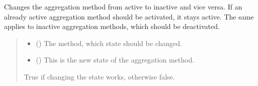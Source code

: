 \documentclass[letterpaper,10pt,english]{sphinxmanual}
\begin{document}
\begin{fulllineitems}
\begin{fulllineitems}
\label{\detokenize{apidoc/src.osm_configurator.model.project.configuration:src.osm_configurator.model.project.configuration.aggregation_configuration.AggregationConfiguration.set_aggregation_method_active}}
\pysigstartsignatures
{}
\pysigstopsignatures
\sphinxAtStartPar
Changes the aggregation method from active to inactive and vice versa. If an already active aggregation
method should be activated, it stays active. The same applies to inactive aggregation methods, which should be deactivated.
\begin{quote}\begin{description}
\begin{itemize}
\item {} 
\sphinxAtStartPar
{} ({\hyperref[\detokenize{apidoc/src.osm_configurator.model.project.calculation:src.osm_configurator.model.project.calculation.aggregation_method_enum.AggregationMethod}]{}}) \textendash{} The method, which state should be changed.

\item {} 
\sphinxAtStartPar
{} () \textendash{} This is the new state of the aggregation method.

\end{itemize}

\sphinxAtStartPar
True if changing the state works, otherwise false.

\sphinxAtStartPar
{}

\end{description}\end{quote}

\end{fulllineitems}


\end{fulllineitems}
\end{document}
